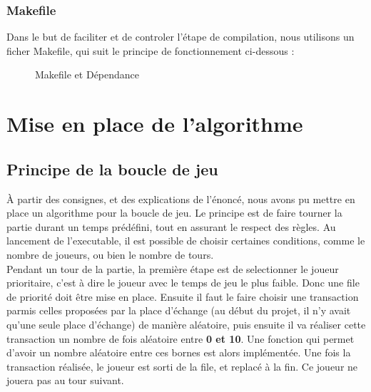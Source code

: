 \documentclass{article}
\begin{document}
\subsubsection{Makefile}
Dans le but de faciliter et de controler l'\'etape de compilation, nous utilisons un ficher Makefile, qui suit le principe de fonctionnement ci-dessous :
\begin{figure}[h]
  \begin{center}
  \caption[le titre]{Makefile et D\'ependance}
\end{center}
\end{figure}


\section{Mise en place de l'algorithme}

\subsection{Principe de la boucle de jeu}

\`A partir des consignes, et des explications de l'\'enonc\'e, nous avons pu mettre en place un algorithme pour la boucle de jeu. 
Le principe est de faire tourner la partie durant un temps pr\'ed\'efini, tout en assurant le respect des r\`egles.
Au lancement de l'executable, il est possible de choisir certaines conditions, comme le nombre de joueurs, ou bien le nombre de tours.\\

Pendant un tour de la partie, la premi\`ere \'etape est de selectionner le joueur prioritaire, c'est \`a dire le joueur avec le temps de jeu le plus
faible. Donc une file de priorit\'e doit \^etre mise en place. 
Ensuite il faut le faire choisir une transaction parmis celles propos\'ees par la place d'\'echange (au d\'ebut du projet, il n'y avait qu'une seule place
d'\'echange) de mani\`ere al\'eatoire, puis ensuite il va r\'ealiser cette transaction un nombre de fois al\'eatoire entre \textbf{0 et 10}.
Une fonction qui permet d'avoir un nombre al\'eatoire entre ces bornes est alors impl\'ement\'ee. 
Une fois la transaction r\'ealis\'ee, le joueur est sorti de la file, et replac\'e \`a la fin. Ce joueur ne jouera pas au tour suivant.\\
\end{document}
